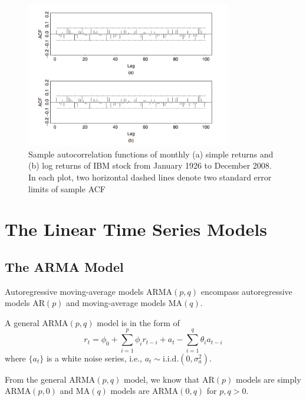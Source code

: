\documentclass[a4paper,11pt]{article}
\begin{document}
\begin{itemize}
\begin{figure}[htbp]
\centering
\includegraphics[width=0.8\textwidth]{img/ibm_return.png}
\caption{\label{fig:orge098069}
Sample autocorrelation functions of monthly (a) simple returns and (b) log returns of IBM stock from January 1926 to December 2008. In each plot, two horizontal dashed lines denote two standard error limits of sample ACF}
\end{figure}
\end{itemize}


\section{The Linear Time Series Models}
\label{sec:org2bdb131}

\subsection{The ARMA Model}
\label{sec:org2df0fcf}

Autoregressive moving-average models \(\mathrm{ARMA}(p, q)\)
encompass autoregressive models \(\mathrm{AR}(p)\) and
moving-average models \(\mathrm{MA}(q)\).

A general \(\mathrm{ARMA}(p, q)\) model is in the form of
\begin{equation}
\label{eq:armapq}
r_t = \phi_0 + \sum_{i=1}^p \phi_i r_{t-i} + a_t - \sum_{i=1}^q \theta_i a_{t-i}
\end{equation}
where \(\{a_t\}\) is a white noise series, i.e., \(a_t \sim
\mathrm{i.i.d.}(0, \sigma^2_a)\).

From the general \(\mathrm{ARMA}(p, q)\) model, we know that \(\mathrm{AR}(p)\) models are
simply \(\mathrm{ARMA}(p, 0)\) and \(\mathrm{MA}(q)\) models are \(\mathrm{ARMA}(0, q)\) for \(p, q >
0\).
\end{document}
